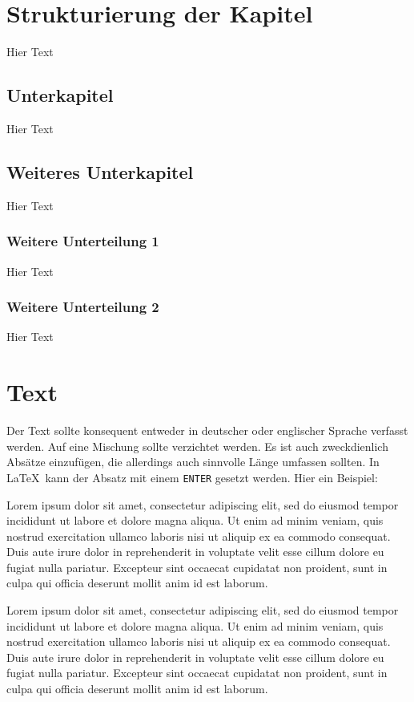 \documentclass[a4paper, 12pt]{article}
\begin{document}
\newpage
\section{Strukturierung der Kapitel} \label{sec:struktur}
Hier Text
\subsection{Unterkapitel}
Hier Text
\subsection{Weiteres Unterkapitel}
Hier Text
\subsubsection{Weitere Unterteilung 1}
Hier Text
\subsubsection{Weitere Unterteilung 2}
Hier Text

\newpage
\section{Text}
Der Text sollte konsequent entweder in deutscher oder englischer Sprache verfasst werden. Auf eine Mischung sollte verzichtet werden. Es ist auch zweckdienlich Absätze einzufügen, die allerdings auch sinnvolle Länge umfassen sollten. In \LaTeX ~kann der Absatz mit einem \verb|ENTER| gesetzt werden. Hier ein Beispiel:

Lorem ipsum dolor sit amet, consectetur adipiscing elit, sed do eiusmod tempor incididunt ut labore et dolore magna aliqua. Ut enim ad minim veniam, quis nostrud exercitation ullamco laboris nisi ut aliquip ex ea commodo consequat. Duis aute irure dolor in reprehenderit in voluptate velit esse cillum dolore eu fugiat nulla pariatur. Excepteur sint occaecat cupidatat non proident, sunt in culpa qui officia deserunt mollit anim id est laborum.

Lorem ipsum dolor sit amet, consectetur adipiscing elit, sed do eiusmod tempor incididunt ut labore et dolore magna aliqua. Ut enim ad minim veniam, quis nostrud exercitation ullamco laboris nisi ut aliquip ex ea commodo consequat. Duis aute irure dolor in reprehenderit in voluptate velit esse cillum dolore eu fugiat nulla pariatur. Excepteur sint occaecat cupidatat non proident, sunt in culpa qui officia deserunt mollit anim id est laborum.
\end{document}

